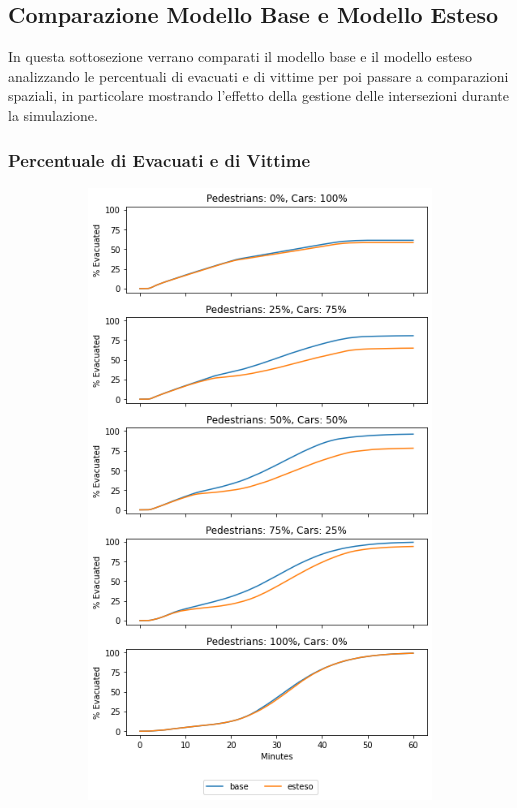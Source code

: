 
\subsection{Comparazione Modello Base e Modello Esteso}
In questa sottosezione verrano comparati il modello base e il modello esteso analizzando
le percentuali di evacuati e di vittime per poi passare a comparazioni spaziali,
in particolare mostrando l'effetto della gestione delle intersezioni durante la simulazione.

\subsubsection*{Percentuale di Evacuati e di Vittime}

\begin{figure}[ht]
    \centering
    \begin{subfigure}{0.45\textwidth}
        \centering
        \includegraphics[width=\textwidth]{images/analisi/comparison-total-evacuated.png}

\end{subfigure}
\end{figure}

